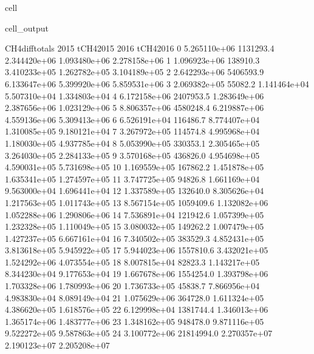 \documentclass[letterpaper,10pt,english]{jupyterBook}
\begin{document}
\begin{sphinxuseclass}{cell}
\begin{sphinxVerbatimOutput}
\begin{sphinxuseclass}{cell_output}
\begin{sphinxVerbatim}[commandchars=\\\{\}]
    CH4\PYGZus{}diff\PYGZus{}totals        2015     tCH4\PYGZus{}2015          2016     tCH4\PYGZus{}2016  \PYGZbs{}
0     \PYGZhy{}5.265110e+06   1131293.4  2.344420e+06  1.093480e+06  2.278158e+06   
1     \PYGZhy{}1.096923e+06    138910.3  3.410233e+05  1.262782e+05  3.104189e+05   
2     \PYGZhy{}2.642293e+06   5406593.9  6.133647e+06  5.399920e+06  5.859531e+06   
3      2.069382e+05     55082.2  1.141464e+04  5.507310e+04  1.334803e+04   
4      6.172158e+06   2407953.5  1.283649e+06  2.387656e+06  1.023129e+06   
5     \PYGZhy{}8.806357e+06   4580248.4  6.219887e+06  4.559136e+06  5.309413e+06   
6      6.526191e+04    116486.7  8.774407e+04  1.310085e+05  9.180121e+04   
7      3.267972e+05    114574.8  4.995968e+04  1.180030e+05  4.937785e+04   
8      5.053990e+05    330353.1  2.305465e+05  3.264030e+05  2.284133e+05   
9     \PYGZhy{}3.570168e+05    436826.0  4.954698e+05  4.590031e+05  5.731698e+05   
10     1.169559e+05    167862.2  1.451878e+05  1.635341e+05  1.274597e+05   
11     3.747725e+05     94826.8  1.661169e+04  9.563000e+04  1.696441e+04   
12     1.337589e+05    132640.0  8.305626e+04  1.217563e+05  1.011743e+05   
13    \PYGZhy{}8.567154e+05   1059409.6  1.132082e+06  1.052288e+06  1.290806e+06   
14     7.536891e+04    121942.6  1.057399e+05  1.232328e+05  1.110049e+05   
15     3.080032e+05    149262.2  1.007479e+05  1.427237e+05  6.667161e+04   
16    \PYGZhy{}7.340502e+05    383529.3  4.852431e+05  3.813618e+05  5.945922e+05   
17     5.944023e+06   1557810.6  3.432021e+05  1.524292e+06  4.073554e+05   
18    \PYGZhy{}8.007815e+04     82823.3  1.143217e+05  8.344230e+04  9.177653e+04   
19     1.667678e+06   1554254.0  1.393798e+06  1.703328e+06  1.780993e+06   
20    \PYGZhy{}1.736733e+05     45838.7  7.866956e+04  4.983830e+04  8.089149e+04   
21     1.075629e+06    364728.0  1.611324e+05  4.386620e+05  1.618576e+05   
22    \PYGZhy{}6.129998e+04   1381744.4  1.346013e+06  1.365174e+06  1.483777e+06   
23    \PYGZhy{}1.348162e+05    948478.0  9.871116e+05  9.522272e+05  9.587863e+05   
24    \PYGZhy{}3.100772e+06  21814994.0  2.270357e+07  2.190123e+07  2.205208e+07   


\end{sphinxVerbatim}
\end{sphinxuseclass}
\end{sphinxVerbatimOutput}
\end{sphinxuseclass}
\end{document}
